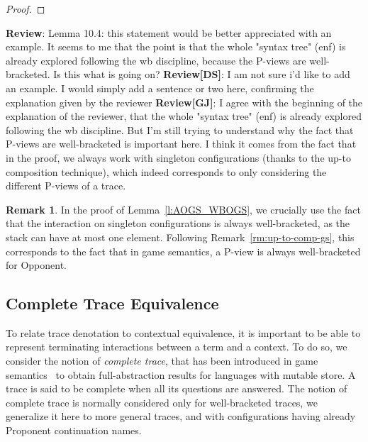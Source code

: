 \documentclass[11pt,a4paper]{amsart}
\theoremstyle{plain}
\theoremstyle{definition}
\theoremstyle{defC}
\theoremstyle{thmC}
\theoremstyle{plain}
\numberwithin{equation}{section}
\newcommand{\uptoComp}[1]{\mathrel{#1^{|\star}}}
\newcommand{\rmm}[1]{{\tt{\lowercase{#1}}}}
\newcommand{\genArr}[2]{\mathrel{\stackrel{{#1}}{\Longrightarrow}_{\rmm{\lowercase{#2}}}}}  %
\newcommand{\ArrA}[1]{\genArr{#1}{A}}  %
\def\R{{\mathcal R}}
\newcommand{\FF}{F}
\newcommand{\GG}{G}
\newcommand{\reff}[1]{(\ref{#1})}
\newcommand{\questPV}[3]{\bar{#1}(#2,#3)}
\theoremstyle{plain}
\theoremstyle{definition}
\newtheorem{remark}[thm]{Remark}
\newcommand{\reviewComment}[1]{\textbf{Review}: {\color{red} #1}}
\newcommand{\reviewCommentDS}[1]{\textbf{Review[DS]}: {\color{green} #1}}
\newcommand{\reviewCommentGJ}[1]{\textbf{Review[GJ]}: {\color{blue} #1}}
\newcommand{\reviewComment}[1]{}
\newcommand{\reviewCommentDS}[1]{}
\newcommand{\reviewCommentGJ}[1]{}
\begin{document}
\begin{proof}
\end{proof} 

\reviewComment{Lemma 10.4: this statement would be better appreciated with an
example. It seems to me that the point is that the whole "syntax tree"
(enf) is already explored following the wb discipline, because the
P-views are well-bracketed. Is this what is going on?}
\reviewCommentDS{I am not sure i'd like to add an example. 
I would simply add a sentence or two here, confirming the explanation given by the reviewer
}
\reviewCommentGJ{I agree with the beginning of the explanation of the reviewer, that the whole "syntax tree"
(enf) is already explored following the wb discipline. But I'm still trying to understand why the fact that P-views are well-bracketed
is important here. I think it comes from the fact that in the proof, we always work with singleton configurations (thanks to the up-to composition technique), 
which indeed corresponds to only considering the different P-views of a trace.}

\begin{remark}
In the proof of Lemma~\ref{l:AOGS_WBOGS}, we crucially use the fact that the
interaction on singleton configurations is always well-bracketed, as
the stack can have at most one element. Following Remark~\ref{rm:up-to-comp-gs}, this corresponds
to the fact that in game semantics, a P-view is always well-bracketed for Opponent. 
\end{remark}

\subsection{Complete Trace Equivalence}

To relate trace denotation to contextual equivalence, it is important to 
be able to represent terminating interactions between a term and a context.
To do so, 
we consider the notion of \emph{complete trace}, 
that has been introduced in game semantics~\cite{abramsky1997linearity} to  
obtain full-abstraction results for languages with mutable 
store. A trace is said to be complete when all its questions
are answered.
The notion of complete trace is normally considered only for well-bracketed traces,
we generalize it here to more general traces,
and with configurations having already Proponent continuation names.
\end{document}
